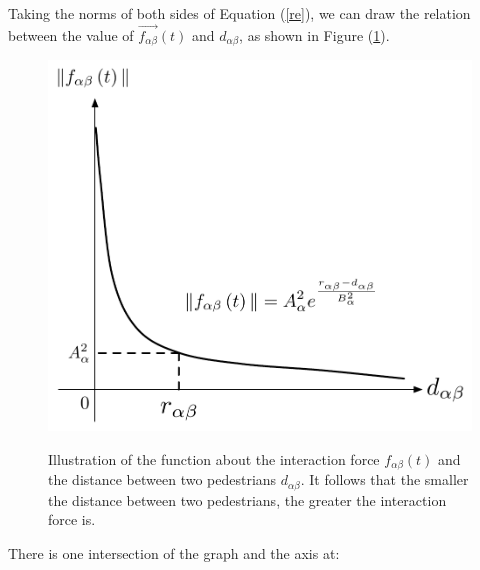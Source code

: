 
Taking the norms of both sides of Equation (\ref{re}), we can draw the relation between the value of $\overrightarrow{f_{\alpha\beta}}(t)$ and $ d_{\alpha\beta} $, as shown in Figure 
(\ref{fig:physicalinteraction2}).\\

\begin{figure}[hb]
    \centering
    {\includegraphics[scale=0.45]{Figures/physicalinteraction.pdf}} 
    \caption[Psysical interaction]{Illustration of the function about the interaction force 
        $f_{\alpha\beta}(t)$ and the distance between two pedestrians
        $d_{\alpha \beta}$. It follows that the smaller the distance between two pedestrians, the greater the interaction force is. }
    \label{fig:physicalinteraction2}
\end{figure}

There is one intersection of the graph and the  axis at:

